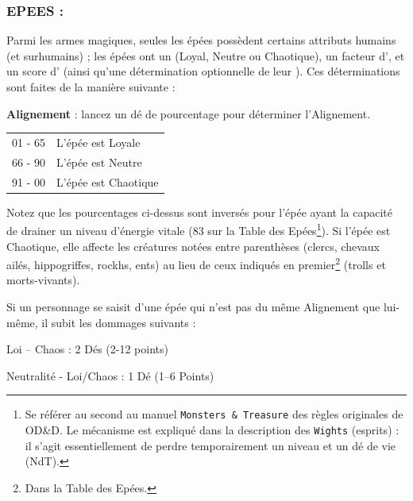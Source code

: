 \subsubsection*{EPEES :}
\label{objet-epees}
{\parindent0pt

Parmi les armes magiques, seules les épées possèdent certains attributs humains (et surhumains) ; les épées ont un  (Loyal, Neutre ou Chaotique), un facteur d', et un score d' (ainsi qu'une détermination optionnelle de leur ). Ces déterminations sont faites de la manière suivante :

\bigskip

\textbf{Alignement} : lancez un dé de pourcentage pour déterminer l'Alignement.

\bigskip

{\parindent2.5cm
\begin{tabular}{p{2.8cm}l}
01 - 65
& L'épée est Loyale \\
66 - 90
& L'épée est Neutre \\
91 - 00
& L'épée est Chaotique \\
\end{tabular}}

\medskip

Notez que les pourcentages ci-dessus sont inversés pour l'épée ayant la capacité de drainer un niveau d'énergie vitale (83 sur la Table des Epées\footnote
{Se référer au second au manuel \texttt{Monsters \& Treasure} des règles originales de OD\&D. Le mécanisme est expliqué dans la description des \texttt{Wights} (esprits) : il s'agit essentiellement de perdre temporairement un niveau et un dé de vie (NdT).}). Si l'épée est Chaotique, elle affecte les créatures notées entre parenthèses (clercs, chevaux ailés, hippogriffes, rockhs, ents) au lieu de ceux indiqués en premier\footnote{Dans la Table des Epées.} (trolls et morts-vivants).

\medskip

Si un personnage se saisit d'une épée qui n'est pas du même Alignement que lui-même, il subit les dommages suivants :

\medskip

{\parindent2cm Loi -- Chaos : 2 Dés (2-12 points)

Neutralité - Loi/Chaos : 1 Dé (1--6 Points)}

}
